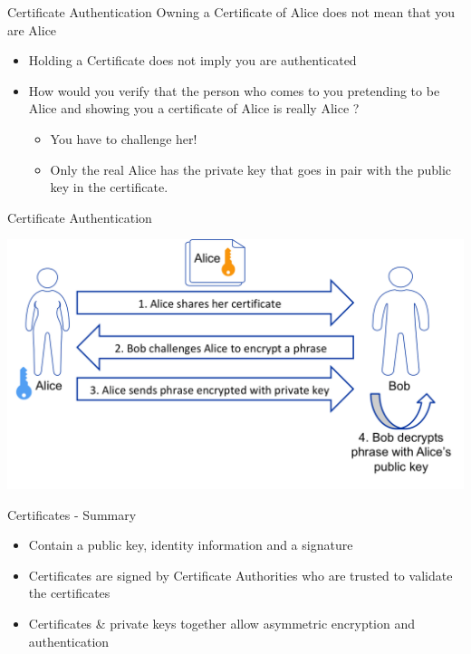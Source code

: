 \documentclass{beamer}
\begin{document}
\begin{frame}{Certificate Authentication}
Owning a Certificate of Alice does not mean that you are Alice
\begin{itemize}
\item Holding a Certificate does not imply you are authenticated
\item How would you verify that the person who comes to you pretending to be Alice and showing you a certificate of Alice is really Alice ?
\begin{itemize}
\item You have to challenge her!
\item Only the real Alice has the private key that goes in pair with the public key in the certificate.
\end{itemize}
\end{itemize}
\end{frame}

\begin{frame}{{\color{red}Certificate Authentication}}
\begin{center}
\includegraphics[width=0.9\linewidth]{certificate-verification.png}
\end{center}
\end{frame}

\begin{frame}{Certificates - Summary}
\begin{itemize}
\item Contain a public key, identity information and a signature
\item Certificates are signed by Certificate Authorities who are trusted to validate the certificates
\item Certificates \& private keys together allow asymmetric encryption and authentication
\end{itemize}
\end{frame}
\end{document}
